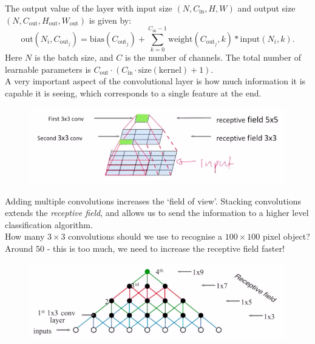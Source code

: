 The output value of the layer with input size $(N,C_{\text{in}}, H, W)$ and output size $(N,C_{\text{out}}, H_{\text{out}}, W_{\text{out}})$ is given by:
\begin{equation*}
\textrm{out}(N_i, C_{\text{out}_j}) = \textrm{bias}(C_{\text{out}_j}) + \sum_{k=0}^{C_{\text{in}} - 1} \textrm{weight}(C_{\text{out}_j}, k) * \textrm{input}(N_i, k).
\end{equation*}
Here $N$ is the batch size, and $C$ is the number of channels. The total number of learnable parameters is $C_{\text{out}} \cdot (C_{\text{in}} \cdot \textrm{size}(\textrm{kernel}) + 1)$.\\

A very important aspect of the convolutional layer is how much information it is capable it is seeing, which corresponds to a single feature at the end. 

\begin{figure}[H]
\centering
\includegraphics[scale=0.4]{multipleconvolution.png}
\end{figure}

Adding multiple convolutions increases the `field of view'. Stacking convolutions extends the \textit{receptive field}, and allows us to send the information to a higher level classification algorithm.\\

How many $3 \times 3$ convolutions should we use to recognise a $100 \times 100$ pixel object? Around $50$ - this is too much, we need to increase the receptive field faster!

\begin{figure}[H]
\centering
\includegraphics[scale=0.4]{multipleconvolutions2.png}
\end{figure}


